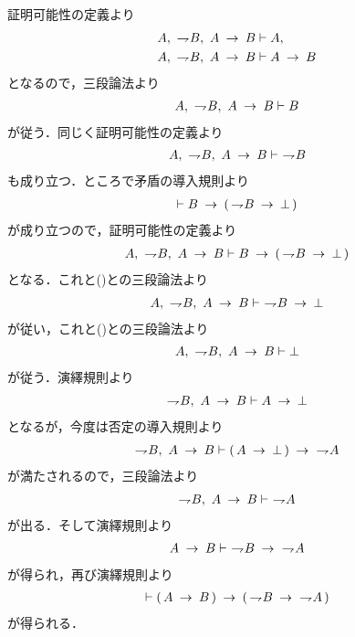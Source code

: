	\begin{prf}
		証明可能性の定義より
		\begin{align}
			A,\ \negation B,\ A \rarrow B &\vdash A, \\
			A,\ \negation B,\ A \rarrow B &\vdash A \rarrow B
		\end{align}
		となるので，三段論法より
		\begin{align}
			A,\ \negation B,\ A \rarrow B \vdash B
			\label{fom:introduction_of_contraposition_1}
		\end{align}
		が従う．同じく証明可能性の定義より
		\begin{align}
			A,\ \negation B,\ A \rarrow B \vdash\ \negation B
			\label{fom:introduction_of_contraposition_2}
		\end{align}
		も成り立つ．ところで矛盾の導入規則より
		\begin{align}
			\vdash B \rarrow (\, \negation B \rarrow \bot\, )
		\end{align}
		が成り立つので，証明可能性の定義より
		\begin{align}
			A,\ \negation B,\ A \rarrow B \vdash
			B \rarrow (\, \negation B \rarrow \bot\, )
		\end{align}
		となる．これと()との三段論法より
		\begin{align}
			A,\ \negation B,\ A \rarrow B \vdash\ \negation B \rarrow \bot
		\end{align}
		が従い，これと()との三段論法より
		\begin{align}
			A,\ \negation B,\ A \rarrow B \vdash \bot
		\end{align}
		が従う．演繹規則より
		\begin{align}
			\negation B,\ A \rarrow B \vdash A \rarrow \bot
		\end{align}
		となるが，今度は否定の導入規則より
		\begin{align}
			\negation B,\ A \rarrow B \vdash 
			(\, A \rarrow \bot\, ) \rarrow\ \negation A
		\end{align}
		が満たされるので，三段論法より
		\begin{align}
			\negation B,\ A \rarrow B \vdash\ \negation A
		\end{align}
		が出る．そして演繹規則より
		\begin{align}
			A \rarrow B \vdash\ \negation B \rarrow\ \negation A
		\end{align}
		が得られ，再び演繹規則より
		\begin{align}
			\vdash (\, A \rarrow B\, ) \rarrow
			(\, \negation B \rarrow\ \negation A\, )
		\end{align}
		が得られる．
		\QED
	\end{prf}
	
